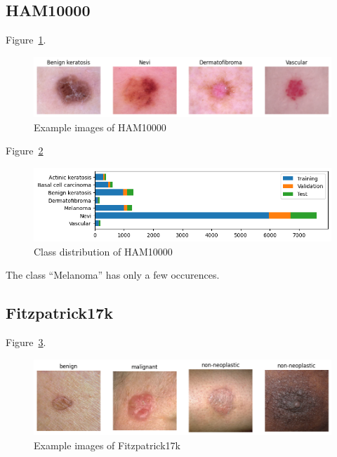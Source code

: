 \subsection{HAM10000}
Figure~\ref{fig:example_images_of_ham10000}.

\begin{figure}[H]
    \begin{center}
    \includegraphics[width=15cm]{../images/example_images_of_ham10000.png}
    \caption{Example images of HAM10000}\label{fig:example_images_of_ham10000}
    \end{center}
\end{figure}

Figure~\ref{fig:class_distribution_of_ham10000}

\begin{figure}[H]
    \begin{center}
    \includegraphics[width=15cm]{../images/class_distribution_of_ham10000.png}
    \caption{Class distribution of HAM10000}\label{fig:class_distribution_of_ham10000}
    \end{center}
\end{figure}

The class ``Melanoma'' has only a few occurences. 



\subsection{Fitzpatrick17k}
Figure~\ref{fig:example_images_of_fitzpatrick17k}.

\begin{figure}[H]
    \begin{center}
    \includegraphics[width=15cm]{../images/example_images_of_fitzpatrick17k.png}
    \caption{Example images of Fitzpatrick17k}\label{fig:example_images_of_fitzpatrick17k}
    \end{center}
\end{figure}

